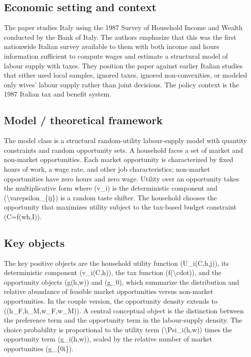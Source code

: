 \documentclass[11pt,a4paper]{article}
\begin{document}
\subsection*{Economic setting and context}
The paper studies Italy using the 1987 Survey of Household Income and Wealth conducted by the Bank of Italy. The authors emphasize that this was the first nationwide Italian survey available to them with both income and hours information sufficient to compute wages and estimate a structural model of labour supply with taxes. They position the paper against earlier Italian studies that either used local samples, ignored taxes, ignored non-convexities, or modeled only wives’ labour supply rather than joint decisions. The policy context is the 1987 Italian tax and benefit system.

\subsection*{Model / theoretical framework}
The model class is a structural random-utility labour-supply model with quantity constraints and random opportunity sets. A household faces a set of market and non-market opportunities. Each market opportunity is characterized by fixed hours of work, a wage rate, and other job characteristics; non-market opportunities have zero hours and zero wage. Utility over an opportunity takes the multiplicative form where (v\_i) is the deterministic component and (\textbackslash{}varepsilon\_\{ij\}) is a random taste shifter. The household chooses the opportunity that maximizes utility subject to the tax-based budget constraint (C=f(wh,I)).

\subsection*{Key objects}
The key positive objects are the household utility function (U\_i(C,h,j)), its deterministic component (v\_i(C,h)), the tax function (f(\textbackslash{}cdot)), and the opportunity objects (g(h,w)) and (g\_0), which summarize the distribution and relative abundance of feasible market opportunities versus non-market opportunities. In the couple version, the opportunity density extends to ((h\_F,h\_M,w\_F,w\_M)). A central conceptual object is the distinction between the preference term and the opportunity term in the labour-supply density. The choice probability is proportional to the utility term (\textbackslash{}Psi\_i(h,w)) times the opportunity term (g\_i(h,w)), scaled by the relative number of market opportunities (g\_\{0i\}).
\end{document}
